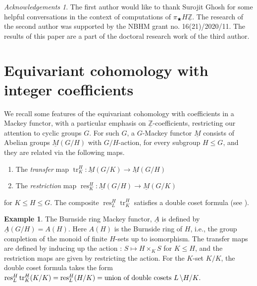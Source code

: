 \documentclass[a4paper,leqno,11pt]{amsart}
\theoremstyle{plain}
\theoremstyle{definition}
\newtheorem{exam}[theorem]{Example}
\theoremstyle{remark}
\newtheorem{ack}[theorem]{Acknowledgements}
\theoremstyle{definition}
\newcommand\tr{\operatorname{tr}}
\newcommand{\res}{\mathit{res}}
\newcommand{\uA}{\underline{A}}
\newcommand{\uM}{\underline{M}}
\newcommand{\uZ}{\underline{\mathbb{Z}}}
\numberwithin{equation}{section}
\renewcommand{\res}{\operatorname{res}}
\begin{document}
	\begin{ack}
The first author would like to thank Surojit Ghosh for some helpful conversations in the context of computations of $\pi_\bigstar H\uZ$. The research of the second author was supported by the NBHM grant no. 16(21)/2020/11. The results of this paper are a part of the doctoral research work of the third author.
\end{ack}	
	
	
	\section{Equivariant cohomology with integer coefficients}\label{eqic}
	We recall some features of the equivariant cohomology with coefficients in a Mackey functor, with a particular emphasis on $ \uZ $-coefficients, restricting our attention to cyclic groups $G  $.  For such 
	 $G$, a $G$-Mackey functor $\underline{M}$ consists of Abelian  groups $ \underline{M}(G/H) $ with $ G/H $-action, for every subgroup $H\leq G$, and they are related via the following maps.
	\begin{enumerate}
		\item The \textit{transfer} map $\tr^H_K\colon  \uM(G/K) \to \uM(G/H)$
		\item The \textit{restriction} map $\res^H_K \colon\uM(G/H) \to \uM(G/K)$
	\end{enumerate}
	 for $K\le H\le G$. The composite $ \res^H_L \tr^H_K $ satisfies a double coset formula (see \cite[\S 3]{HHR}). 
	 \begin{exam}
	 	The Burnside ring Mackey functor, $\uA$ is  defined by $\uA(G/H)=A(H)$. Here $ A(H) $ is the Burnside ring of $H$, i.e., the group completion of the monoid of finite $H$-sets up to isomorphism. The transfer maps are defined by inducing up the action : $S \mapsto H\times_K S$ for $K\leq H$, and the restriction maps are given by  restricting the action. For the $ K $-set $ K/K $, the double coset formula takes the form $  \res^H_L \tr^H_K(K/K)=\res_L^H(H/K)=\textup{union of double cosets $ L \,\backslash H / K $}. $
	 \end{exam}
\end{document}
